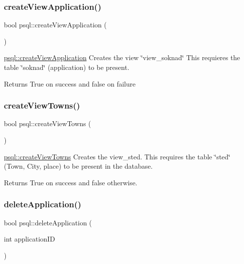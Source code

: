 \subsubsection{\texorpdfstring{createViewApplication()}{createViewApplication()}}
{\footnotesize\ttfamily bool psql\+::create\+View\+Application (\begin{DoxyParamCaption}{ }\end{DoxyParamCaption})}



\mbox{\hyperlink{classpsql_ad6fb8e1e7177c7996f297d477ecceb27}{psql\+::create\+View\+Application}} Creates the view \char`\"{}view\+\_\+soknad\char`\"{} This requieres the table \char`\"{}soknad\char`\"{} (application) to be present. 

\begin{DoxyReturn}{Returns}
True on success and false on failure 
\end{DoxyReturn}
\mbox{\label{classpsql_ac5b1230ac405a600b67b144060b33a0d}} 
\subsubsection{\texorpdfstring{createViewTowns()}{createViewTowns()}}
{\footnotesize\ttfamily bool psql\+::create\+View\+Towns (\begin{DoxyParamCaption}{ }\end{DoxyParamCaption})}



\mbox{\hyperlink{classpsql_ac5b1230ac405a600b67b144060b33a0d}{psql\+::create\+View\+Towns}} Creates the view\+\_\+sted. This requires the table \char`\"{}sted\char`\"{} (Town, City, place) to be present in the database. 

\begin{DoxyReturn}{Returns}
True on success and false otherwise. 
\end{DoxyReturn}
\mbox{\label{classpsql_a999ee8e2d813892411ef502ebc055a79}} 
\subsubsection{\texorpdfstring{deleteApplication()}{deleteApplication()}}
{\footnotesize\ttfamily bool psql\+::delete\+Application (\begin{DoxyParamCaption}\item[{int}]{application\+ID }\end{DoxyParamCaption})}



